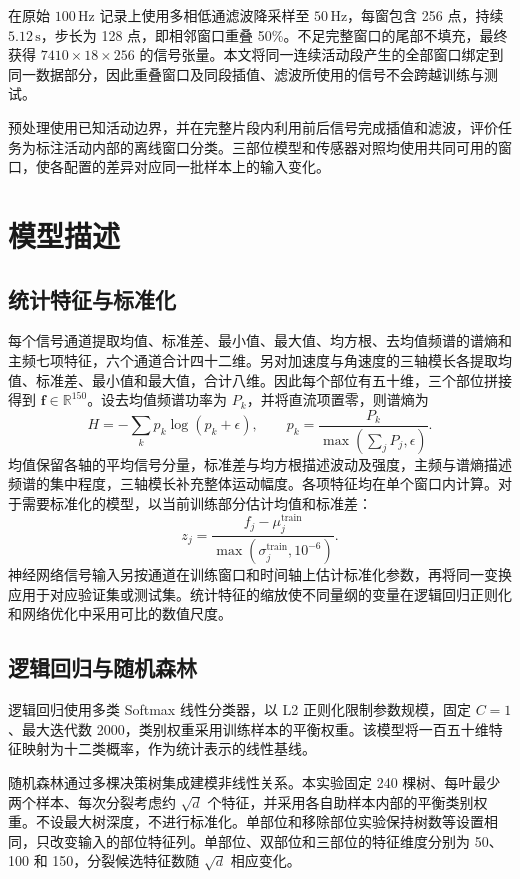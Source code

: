 \documentclass[UTF8,zihao=-4,a4paper,fontset=windows]{ctexart}
\begin{document}
在原始 $100\,\mathrm{Hz}$ 记录上使用多相低通滤波降采样至 $50\,\mathrm{Hz}$\cite{scipy}，每窗包含 256 点，持续 $5.12\,\mathrm{s}$，步长为 128 点，即相邻窗口重叠 50\%。不足完整窗口的尾部不填充，最终获得 $7410\times18\times256$ 的信号张量。本文将同一连续活动段产生的全部窗口绑定到同一数据部分，因此重叠窗口及同段插值、滤波所使用的信号不会跨越训练与测试。

预处理使用已知活动边界，并在完整片段内利用前后信号完成插值和滤波，评价任务为标注活动内部的离线窗口分类。三部位模型和传感器对照均使用共同可用的窗口，使各配置的差异对应同一批样本上的输入变化。

\section{模型描述}
\subsection{统计特征与标准化}
每个信号通道提取均值、标准差、最小值、最大值、均方根、去均值频谱的谱熵和主频七项特征，六个通道合计四十二维。另对加速度与角速度的三轴模长各提取均值、标准差、最小值和最大值，合计八维。因此每个部位有五十维，三个部位拼接得到 $\boldsymbol f\in\mathbb R^{150}$。设去均值频谱功率为 $P_k$，并将直流项置零，则谱熵为
\begin{equation}
 H=-\sum_k p_k\log(p_k+\epsilon),\qquad p_k=\frac{P_k}{\max(\sum_jP_j,\epsilon)}.
\end{equation}
均值保留各轴的平均信号分量，标准差与均方根描述波动及强度，主频与谱熵描述频谱的集中程度，三轴模长补充整体运动幅度。各项特征均在单个窗口内计算。对于需要标准化的模型，以当前训练部分估计均值和标准差：
\begin{equation}
 z_j=\frac{f_j-\mu_j^{\mathrm{train}}}{\max(\sigma_j^{\mathrm{train}},10^{-6})}.
\end{equation}
神经网络信号输入另按通道在训练窗口和时间轴上估计标准化参数，再将同一变换应用于对应验证集或测试集。统计特征的缩放使不同量纲的变量在逻辑回归正则化和网络优化中采用可比的数值尺度。

\subsection{逻辑回归与随机森林}
逻辑回归使用多类 Softmax 线性分类器，以 L2 正则化限制参数规模，固定 $C=1$、最大迭代数 2000，类别权重采用训练样本的平衡权重。该模型将一百五十维特征映射为十二类概率，作为统计表示的线性基线。

随机森林通过多棵决策树集成建模非线性关系\cite{breiman}。本实验固定 240 棵树、每叶最少两个样本、每次分裂考虑约 $\sqrt d$ 个特征，并采用各自助样本内部的平衡类别权重。不设最大树深度，不进行标准化。单部位和移除部位实验保持树数等设置相同，只改变输入的部位特征列。单部位、双部位和三部位的特征维度分别为 50、100 和 150，分裂候选特征数随 $\sqrt d$ 相应变化。
\end{document}
